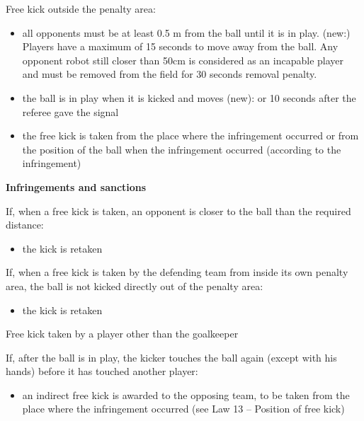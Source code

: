{\bigskip

Free kick outside the penalty area:

\begin{itemize}
\item all opponents must be at least 0.5 m from the ball until it is in play. (new:) Players have a maximum of 15 seconds to move away from the ball. Any opponent robot still closer than 50cm is considered as an incapable player and must be removed from the field for 30 seconds removal penalty.
\item the ball is in play when it is kicked and moves (new): or 10 seconds after the referee gave the signal
\item the free kick is taken from the place where the infringement occurred or from the position of the ball when the infringement occurred (according to the infringement)
\end{itemize}

\bigskip

{\bfseries Infringements and sanctions}

\headlinebox

If, when a free kick is taken, an opponent is closer to the ball than the required distance:

\begin{itemize}
\item the kick is retaken
\end{itemize}

If, when a free kick is taken by the defending team from inside its own penalty area, the ball is not kicked directly out of the penalty area:


\begin{itemize}
\item the kick is retaken
\end{itemize}

\bigskip

Free kick taken by a player other than the goalkeeper

If, after the ball is in play, the kicker touches the ball again (except with his hands) before it has touched another player:

\begin{itemize}
\item an indirect free kick is awarded to the opposing team, to be taken from the place where the infringement occurred (see Law 13 -- Position of free kick)
\end{itemize}

}
